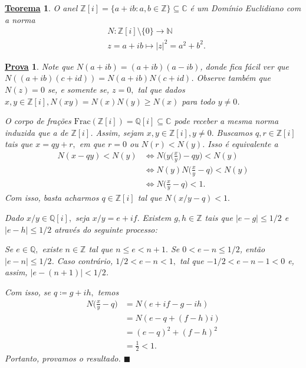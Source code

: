 \documentclass{article}
\newtheorem*{theorem*}{\underline{Teorema}}
\newtheorem*{proof*}{\underline{Prova}}
\renewcommand\qedsymbol{$\blacksquare$}
\begin{document}
    \begin{theorem*}
      O anel \(\mathbb{Z}[i] = \{a + ib: a, b\in \mathbb{Z}\}\subseteq{\mathbb{C}}\) é um Domínio Euclidiano com a norma
      \begin{align*}
   &N:\mathbb{Z}[i]\setminus{\{0\}}\rightarrow \mathbb{N}\\
   &z = a + ib\mapsto |z|^{2} = a^{2} + b^{2}.
      \end{align*}
    \end{theorem*}
    \begin{proof*}
      Note que \(N(a+ib) = (a+ib)(a-ib)\), donde fica fácil ver que \(N((a+ib)(c+id)) = N(a+ib)N(c+id)\).
      Observe também que \(N(z) = 0\) se, e somente se, \(z = 0,\) tal que dados \(x, y\in \mathbb{Z}[i], N(xy) = N(x)N(y)
      \geq N(x)\) para todo \(y\neq0\).

      O corpo de frações \(\mathrm{Frac}(\mathbb{Z}[i]) = \mathbb{Q}[i] \subseteq{\mathbb{C}}\) pode receber a mesma norma
      induzida que a de \(\mathbb{Z}[i]\). Assim, sejam \(x, y\in \mathbb{Z}[i], y\neq0.\) Buscamos \(q, r\in \mathbb{Z}[i]\) tais que
      \(x = qy + r,\) em que \(r=0\) ou \(N(r) < N(y)\). Isso é equivalente a
      \begin{align*}
        N(x-qy) < N(y) &\Longleftrightarrow N \biggl(y \biggl(\frac{x}{y}\biggr) - qy\biggr) < N(y)\\
                       &\Longleftrightarrow N(y) N \biggl(\frac{x}{y}-q\biggr) < N(y)\\
                       &\Longleftrightarrow N \biggl(\frac{x}{y} - q\biggr) < 1.
      \end{align*}
      Com isso, basta acharmos \(q\in \mathbb{Z}[i]\) tal que \(N(x/y - q) < 1.\)

      Dado \(x/y\in \mathbb{Q}[i],\) seja \(x/y = e + if.\) Existem \(g, h\in \mathbb{Z}\)
      tais que \(|e-g|\leq 1/2\) e \(|e-h|\leq 1/2\) através do seguinte processo:

      Se \(e\in \mathbb{Q},\) existe \(n\in \mathbb{Z}\) tal que \(n\leq e < n+1.\) Se \(0 < e-n\leq 1/2\),
      então \(|e-n|\leq 1/2\). Caso contrário, \(1/2 < e-n < 1,\) tal que \(-1/2 < e - n - 1 < 0\) e, assim,
      \(|e-(n+1)| < 1/2\).

      Com isso, se \(q\coloneqq g + ih,\) temos 
      \begin{align*}
        N \biggl(\frac{x}{y} - q\biggr) &= N(e + if - g - ih)\\
                                        &= N(e - q + (f-h)i)\\
                                        &= (e-q)^{2} + (f-h)^{2}\\
                                        &=\frac{1}{2} < 1.
      \end{align*}
      Portanto, provamos o resultado. \qedsymbol
    \end{proof*}
\end{document}
